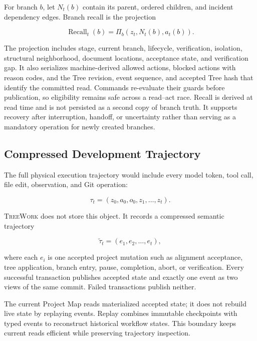 \documentclass[11pt]{article}
\newcommand{\system}{\textsc{TreeWork}\xspace}
\newcommand{\Recall}{\operatorname{Recall}}
\theoremstyle{definition}
\begin{document}
For branch $b$, let $N_t(b)$ contain its parent, ordered children, and incident
dependency edges.  Branch recall is the projection

\begin{equation}
  \Recall_t(b)
  =
  \Pi_b\!\left(
    z_t,
    N_t(b),
    a_t(b)
  \right).
  \label{eq:recall}
\end{equation}

The projection includes stage, current branch, lifecycle, verification,
isolation, structural neighborhood, document locations, acceptance state, and
verification gap.  It also serializes machine-derived allowed actions, blocked
actions with reason codes, and the Tree revision, event sequence, and accepted
Tree hash that identify the committed read.  Commands re-evaluate their guards
before publication, so eligibility remains safe across a read--act race.  Recall
is derived at read time and is not persisted as a second copy of branch truth.
It supports recovery after interruption, handoff, or uncertainty rather than
serving as a mandatory operation for newly created branches.

\subsection{Compressed Development Trajectory}

The full physical execution trajectory would include every model token, tool
call, file edit, observation, and Git operation:

\begin{equation}
  \tau_t=(z_0,a_0,o_0,z_1,\ldots,z_t).
\end{equation}

\system does not store this object.  It records a compressed semantic
trajectory

\begin{equation}
  \widetilde{\tau}_t=(e_1,e_2,\ldots,e_t),
  \label{eq:compressed-trajectory}
\end{equation}

where each $e_i$ is one accepted project mutation such as alignment acceptance,
tree application, branch entry, pause, completion, abort, or verification.
Every successful transaction publishes accepted state and exactly one event as
two views of the same commit.  Failed transactions publish neither.

The current Project Map reads materialized accepted state; it does not rebuild
live state by replaying events.  Replay combines immutable checkpoints with
typed events to reconstruct historical workflow states.  This boundary keeps
current reads efficient while preserving trajectory inspection.
\end{document}
